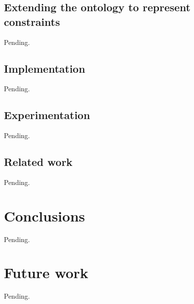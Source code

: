 \documentclass[a4paper, 10pt]{article}
\begin{document}
\subsection{Extending the ontology to represent constraints}

Pending.


\subsection{Implementation}

Pending.


\subsection{Experimentation}

Pending.


\subsection{Related work}

Pending.


\section{Conclusions}

Pending.


\section{Future work}

Pending.


%
%
\end{document}
